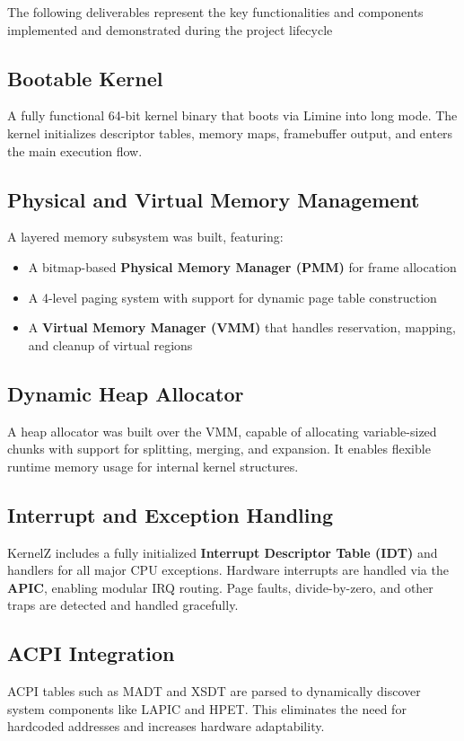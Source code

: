 \documentclass[12pt]{extarticle}
\begin{document}
The following deliverables represent the key functionalities and components implemented and demonstrated during the project lifecycle

\subsection{Bootable Kernel}
A fully functional 64-bit kernel binary that boots via Limine into long mode. The kernel initializes descriptor tables, memory maps, framebuffer output, and enters the main execution flow.

\subsection{Physical and Virtual Memory Management}
A layered memory subsystem was built, featuring:
\begin{itemize}
    \item A bitmap-based \textbf{Physical Memory Manager (PMM)} for frame allocation
    \item A 4-level paging system with support for dynamic page table construction
    \item A \textbf{Virtual Memory Manager (VMM)} that handles reservation, mapping, and cleanup of virtual regions
\end{itemize}

\subsection{Dynamic Heap Allocator}
A heap allocator was built over the VMM, capable of allocating variable-sized chunks with support for splitting, merging, and expansion. It enables flexible runtime memory usage for internal kernel structures.

\subsection{Interrupt and Exception Handling}
KernelZ includes a fully initialized \textbf{Interrupt Descriptor Table (IDT)} and handlers for all major CPU exceptions. Hardware interrupts are handled via the \textbf{APIC}, enabling modular IRQ routing. Page faults, divide-by-zero, and other traps are detected and handled gracefully.

\subsection{ACPI Integration}
ACPI tables such as MADT and XSDT are parsed to dynamically discover system components like LAPIC and HPET. This eliminates the need for hardcoded addresses and increases hardware adaptability.
\end{document}
